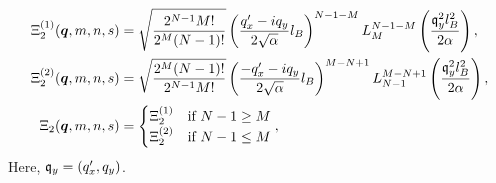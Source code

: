 \begin{align}
  \Xi_2 ^{(1)}(\bm{q}, m, n, s) &= \sqrt{\frac{2^{N-1} M!}{2^M (N-1)!}}
                                   \left( \frac{q'_x - iq_y}{2 \sqrt{\alpha }} l_B \right)^{N-1 - M}
                                   L^{N-1 -M}_{M} \left( \frac{\mathfrak{q}_y^2 l_B^2}{2 \alpha } \right),\\
  \Xi_2 ^{(2)}(\bm{q}, m, n, s) &= \sqrt{\frac{2^M (N-1)!}{2^{N-1} M!}}
                                   \left( \frac{-q'_x - iq_y}{2 \sqrt{\alpha }} l_B \right)^{M-N + 1}
                                   L^{M - N + 1}_{N-1} \left( \frac{\mathfrak{q}_y^2 l_B^2}{2 \alpha } \right),\\
  \Xi_2(\bm{q}, m, n, s) &=
          \begin{cases}
            \Xi _2 ^{(1)} & \text{if } N-1 \geq M\\
            \Xi _2 ^{(2)} & \text{if } N-1 \leq M
          \end{cases},
\end{align}
Here, \( \mathfrak{q}_y = (q'_x, q_y) \).


